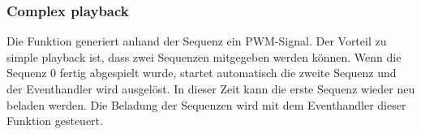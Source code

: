 \subsubsection*{Complex playback}\label{sec:Complex playback}
Die Funktion generiert anhand der Sequenz ein PWM-Signal. Der
Vorteil zu simple playback ist, dass zwei Sequenzen mitgegeben werden können. Wenn die Sequenz 0 fertig abgespielt wurde, startet automatisch die zweite Sequenz und der Eventhandler wird ausgelöst. In dieser Zeit kann die erste Sequenz wieder neu beladen werden. Die Beladung der Sequenzen wird mit dem Eventhandler dieser Funktion gesteuert. 

